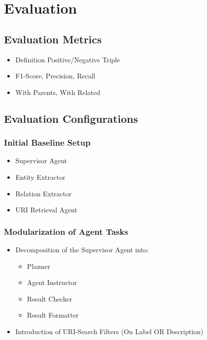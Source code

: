 \documentclass[a4paper,oneside,bibliography=totoc]{scrbook}
\begin{document}
\chapter{Evaluation}
\label{ch:evaluation}
\section{Evaluation Metrics}
\label{sec:evaluation_metrics}
\begin{itemize}
  \item Definition Positive/Negative Triple \cite{Josifoski2021}
  \item F1-Score, Precision, Recall
  \item With Parents, With Related
\end{itemize}


\section{Evaluation Configurations}
\label{sec:evaluation_configurations}
\subsection{Initial Baseline Setup}
\label{subsec:initial_baseline_setup}
\begin{itemize}
  \item Supervisor Agent
  \item Entity Extractor
  \item Relation Extractor
  \item URI Retrieval Agent
\end{itemize}

\subsection{Modularization of Agent Tasks}
\label{subsec:modularization_agent_tasks}
\begin{itemize}
  \item Decomposition of the Supervisor Agent into:
        \begin{itemize}
          \item Planner
          \item Agent Instructor
          \item Result Checker
          \item Result Formatter
        \end{itemize}

  \item Introduction of URI-Search Filters (On Label OR Description)
\end{itemize}
\end{document}
